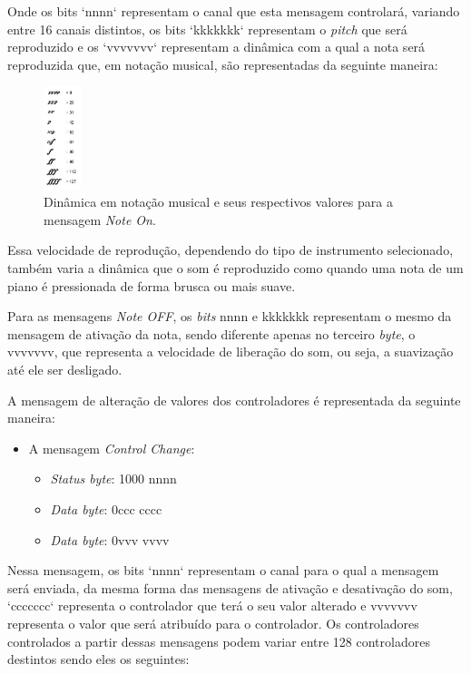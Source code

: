 \documentclass[12pt]{report}
\begin{document}
Onde os bits `nnnn` representam o canal que esta mensagem controlará,
variando entre 16 canais distintos, os bits `kkkkkkk` representam o
{\it pitch} que será reproduzido e os `vvvvvvv` representam a dinâmica
com a qual a nota será reproduzida que, em notação musical, são
representadas da seguinte maneira:

\begin{figure}[H]
  \centering
    \includegraphics[width=0.1\textwidth]{imagens/nuance-velocity-table.jpg}
    \caption{Dinâmica em notação musical e seus respectivos valores
      para a mensagem {\it Note On}.}
  \label{fig:Velocidades em notação musical}
\end{figure}

Essa velocidade de reprodução, dependendo do tipo de instrumento
selecionado, também varia a dinâmica que o som é reproduzido como
quando uma nota de um piano é pressionada de forma brusca ou mais
suave.

Para as mensagens {\it Note OFF}, os {\it bits} nnnn e kkkkkkk
representam o mesmo da mensagem de ativação da nota, sendo diferente
apenas no terceiro {\it byte}, o vvvvvvv, que representa a velocidade
de liberação do som, ou seja, a suavização até ele ser desligado.

A mensagem de alteração de valores dos controladores é representada da seguinte maneira:
\begin{itemize}
  \item A mensagem {\it Control Change}:
  \begin{itemize}
    \item {\it Status byte}: 1000 nnnn
    \item {\it Data byte}: 0ccc cccc
    \item {\it Data byte}: 0vvv vvvv
  \end{itemize}
\end{itemize}

Nessa mensagem, os bits `nnnn` representam o canal para o qual a
mensagem será enviada, da mesma forma das mensagens de ativação e
desativação do som, `ccccccc` representa o controlador que terá o seu
valor alterado e vvvvvvv representa o valor que será atribuído para o
controlador. Os controladores controlados a partir dessas mensagens
podem variar entre 128 controladores destintos sendo eles os
seguintes:
\end{document}
